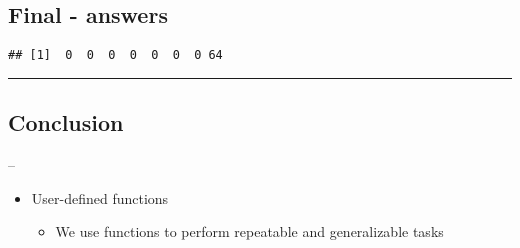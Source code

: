 \documentclass[]{article}
\newenvironment{Shaded}{\begin{snugshade}}{\end{snugshade}}
\newcommand{\ControlFlowTok}[1]{\textcolor[rgb]{0.13,0.29,0.53}{\textbf{#1}}}
\newcommand{\DataTypeTok}[1]{\textcolor[rgb]{0.13,0.29,0.53}{#1}}
\newcommand{\DecValTok}[1]{\textcolor[rgb]{0.00,0.00,0.81}{#1}}
\newcommand{\KeywordTok}[1]{\textcolor[rgb]{0.13,0.29,0.53}{\textbf{#1}}}
\newcommand{\NormalTok}[1]{#1}
\newcommand{\OperatorTok}[1]{\textcolor[rgb]{0.81,0.36,0.00}{\textbf{#1}}}
\newcommand{\StringTok}[1]{\textcolor[rgb]{0.31,0.60,0.02}{#1}}
\providecommand{\tightlist}{%
  \setlength{\itemsep}{0pt}\setlength{\parskip}{0pt}}
\begin{document}
\hypertarget{final---answers-3}{%
\subsection{Final - answers}\label{final---answers-3}}

\begin{Shaded}
\end{Shaded}

\begin{verbatim}
## [1]  0  0  0  0  0  0  0 64
\end{verbatim}

\begin{center}\rule{0.5\linewidth}{\linethickness}\end{center}

\hypertarget{conclusion}{%
\subsection{Conclusion}\label{conclusion}}

--

\begin{itemize}
\tightlist
\item
  User-defined functions

  \begin{itemize}
  \tightlist
  \item
    We use functions to perform repeatable and generalizable tasks
  \end{itemize}
\end{itemize}
\end{document}
